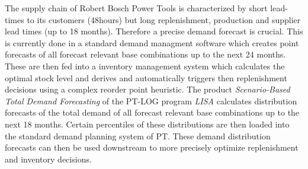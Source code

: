 
The supply chain of Robert Bosch Power Tools is characterized by short lead-times to its customers (48hours) but long replenishment, production and supplier lead times (up to 18 months). Therefore a precise demand forecast is crucial. This is currently done in a standard demand managment software which creates point forecasts of all forecast relevant base combinations up to the next 24 months. These are then fed into a inventory management system which calculates the optimal stock level and derives and automatically triggers then replenishment decisions using a complex reorder point heuristic.  The product \textit{Scenario-Based Total Demand Forecasting} of the PT-LOG program \textit{LISA} calculates distribution forecasts of the total demand of all forecast relevant base combinations up to the next 18 months. Certain percentiles of these distributions are then loaded into the standard demand planning system of PT. These demand distribution forecasts can then be used downstream to more precisely optimize replenishment and inventory decisions.

